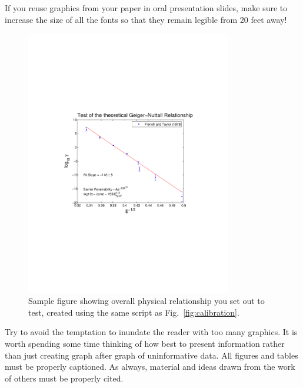 If you reuse graphics from your
paper in oral presentation slides, make sure to increase the size of
all the fonts so that they remain legible from 20 feet away!


\begin{figure}[htb]
\includegraphics[width=9cm]{frenchtaylor.pdf}
\caption{Sample figure showing overall physical relationship you set
out to test, created using the same script as Fig.~\ref{fig:calibration}.
}
\label{fig:frenchtaylor}
\end{figure}

Try to avoid the temptation to inundate the reader with too many
graphics.  It is worth spending some time thinking of how best to
present information rather than just creating graph after graph of
uninformative data.  All figures and tables must be properly
captioned.  As always, material and ideas drawn from the work of others must be
properly cited.

